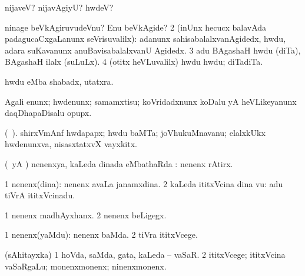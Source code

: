 \noindent                         
\gl{\pagu}
\bmng
\bnum
{}  
\banum
{} nijaveV? nijavAgiyU? hwdeV? 

  ninage beVkAgiruvudeVnu? Enu beVkAgide? 
\eanum
\numie
\num{2}  (inUnx hecucx balavAda padagucaCxgaLanunx seVrisuvalilx):  adanunx sahisabalalxvanAgidedx, hwdu, adara suKavanunx anuBavisabalalxvanU Agidedx.   
\num{3}  adu BAgashaH hwdu (diTa), BAgashaH ilalx (suLuLx). 
\num{4}  (otitx heVLuvalilx) hwdu hwdu; diTadiTa.
\enum
\emng
\eentry

\bentry
{} 
\gl{\nA} 
\bmng
hwdu eMba shabadx, utatxra.
\emng

\noindent
\gl{\pagu}
\bmng
{} Agali enunx; hwdenunx; samamxtisu; koVridadxnunx koDalu yA heVLikeyanunx daqDhapaDisalu opupx.
\emng
\eentry

\bentry
{} 
\gl{\nA} 
\bmng
(\bava\ ). 
shirxVmAnf hwdapapx; hwdu baMTa; joVhukuMnavanu; elalxkUkx hwdenunxva, nisasxtatxvX vayxkitx.
\emng
\eentry

\bentry
{} 
\gl{\sapUpa} 
\bmng
(\pArxparx\ yA \kAparx) nenenxya, kaLeda dinada eMbathaRda \sapUpa:  nenenx  rAtirx.
\emng
\eentry

\bentry
{} 
\gl{\nA} 
\bmng
\bnum
\num{1} nenenx(dina):  nenenx avaLa janamxdina. 
\num{2} kaLeda ititxVcina dina \mo vu:   adu tiVrA ititxVcinadu.
\enum
\emng 

\noindent
\gl{\pagu}
\bmng
\bnum
\num{1}  nenenx madhAyxhanx. 
\num{2}  nenenx beLigegx.
\enum
\emng
\eentry

\bentry
{} 
\gl{\kirxvi} 
\bmng
\bnum
\num{1} nenenx(yaMdu):   nenenx baMda. 
\num{2} tiVra ititxVcege.
\enum
\emng
\eentry

\bentry
{} 
\gl{\nA} 
\bmng
(sAhitayxka) 
\bnum
\num{1} hoVda, saMda, gata, kaLeda -- vaSaR. 
\num{2} ititxVcege; ititxVcina vaSaRgaLu; monenxmonenx; ninenxmonenx.
\enum
\emng
\eentry

